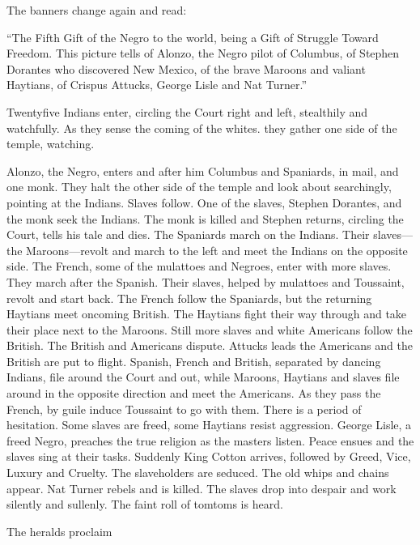 \documentclass[letterpaper,10pt,english]{jupyterBook}
\begin{document}
\sphinxAtStartPar
The banners change again and read:

\sphinxAtStartPar
“The Fifth Gift of the Negro to the world, being a Gift of Struggle Toward Freedom. This picture tells of Alonzo, the Negro pilot of Columbus, of Stephen Dorantes who discovered New Mexico, of the brave Maroons and valiant Haytians, of Crispus Attucks, George Lisle and Nat Turner.”

\sphinxAtStartPar
Twenty\sphinxhyphen{}five Indians enter, circling the Court right and left, stealthily and watchfully. As they sense the coming of the whites. they gather one side of the temple, watching.

\sphinxAtStartPar
Alonzo, the Negro, enters and after him Columbus and Spaniards, in mail, and one monk. They halt the other side of the temple and look about searchingly, pointing at the Indians. Slaves follow. One of the slaves, Stephen Dorantes, and the monk seek the Indians. The monk is killed and Stephen returns, circling the Court, tells his tale and dies. The Spaniards march on the Indians. Their slaves—the Maroons—revolt and march to the left and meet the Indians on the opposite side. The French, some of the mulattoes and Negroes, enter with more slaves. They march after the Spanish. Their slaves, helped by mulattoes and Toussaint, revolt and start back. The French follow the Spaniards, but the returning Haytians meet oncoming British. The Haytians fight their way through and take their place next to the Maroons. Still more slaves and white Americans follow the British. The British and Americans dispute. Attucks leads the Americans and the British are put to flight. Spanish, French and British, separated by dancing Indians, file around the Court and out, while Maroons, Haytians and slaves file around in the opposite direction and meet the Americans. As they pass the French, by guile induce Toussaint to go with them. There is a period of hesitation. Some slaves are freed, some Haytians resist aggression. George Lisle, a freed Negro, preaches the true religion as the masters listen. Peace ensues and the slaves sing at their tasks. Suddenly King Cotton arrives, followed by Greed, Vice, Luxury and Cruelty. The slaveholders are seduced. The old whips and chains appear. Nat Turner rebels and is killed. The slaves drop into despair and work silently and sullenly. The faint roll of tomtoms is heard.

\sphinxAtStartPar
The heralds proclaim
\end{document}
